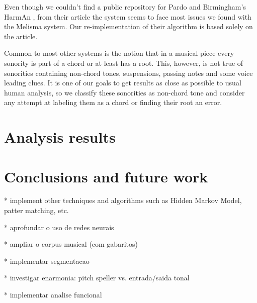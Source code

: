 \documentclass{article}
\begin{document}
Even though we couldn't find a public repository for Pardo and
Birmingham's HarmAn \cite{pardo99:automated}, from their article the
system seems to face most issues we found with the Melisma system. Our
re-implementation of their algorithm is based solely on the article.

Common to most other systems is the notion that in a musical piece
every sonority is part of a chord or at least has a root. This,
however, is not true of sonorities containing non-chord tones,
suspensions, passing notes and some voice leading clues. It is one of
our goals to get results as close as possible to usual human analysis,
so we classify these sonorities as non-chord tone and consider any
attempt at labeling them as a chord or finding their root an error.
 
\section{Analysis results}
\label{sec:analysis-results}

\section{Conclusions and future work}
\label{sec:concl-future-work}


* implement other techniques and algorithms such as Hidden Markov
Model, patter matching, etc.

* aprofundar o uso de redes neurais

* ampliar o corpus musical (com gabaritos)

* implementar segmentacao

* investigar enarmonia: pitch speller vs. entrada/saida tonal

* implementar analise funcional



\end{document}
